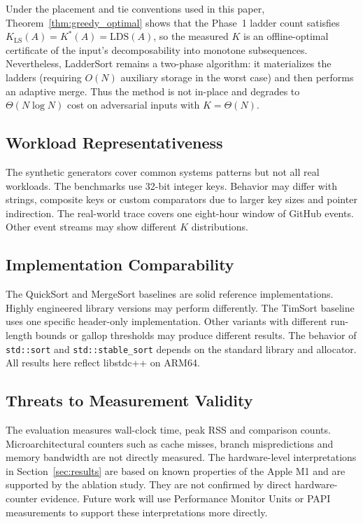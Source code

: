 \documentclass{ieeeaccess}
\theoremstyle{plain}
\theoremstyle{definition}
\begin{document}
Under the placement and tie conventions used in this paper, Theorem~\ref{thm:greedy_optimal} shows that the Phase~1 ladder count satisfies \(K_{\mathrm{LS}}(A)=K^*(A)=\mathrm{LDS}(A)\), so the measured $K$ is an offline-optimal certificate of the input's decomposability into monotone subsequences.  Nevertheless, LadderSort remains a two-phase algorithm: it materializes the ladders (requiring $O(N)$ auxiliary storage in the worst case) and then performs an adaptive merge.  Thus the method is not in-place and degrades to $\Theta(N\log N)$ cost on adversarial inputs with $K=\Theta(N)$.


\subsection{Workload Representativeness}
The synthetic generators cover common systems patterns but not all real workloads. The benchmarks use 32-bit integer keys. Behavior may differ with strings, composite keys or custom comparators due to larger key sizes and pointer indirection. The real-world trace covers one eight-hour window of GitHub events. Other event streams may show different $K$ distributions.

\subsection{Implementation Comparability}
The QuickSort and MergeSort baselines are solid reference implementations. Highly engineered library versions may perform differently. The TimSort baseline uses one specific header-only implementation. Other variants with different run-length bounds or gallop thresholds may produce different results. The behavior of \texttt{std::sort} and \texttt{std::stable\_sort} depends on the standard library and allocator. All results here reflect libstdc++ on ARM64.

\subsection{Threats to Measurement Validity}
The evaluation measures wall-clock time, peak RSS and comparison counts. Microarchitectural counters such as cache misses, branch mispredictions and memory bandwidth are not directly measured. The hardware-level interpretations in Section~\ref{sec:results} are based on known properties of the Apple M1 and are supported by the ablation study. They are not confirmed by direct hardware-counter evidence. Future work will use Performance Monitor Units or PAPI measurements to support these interpretations more directly.
\end{document}
